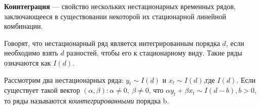 \documentclass[a0,final]{a0poster}
\begin{document}
\begin{multicols}{4}
\begin{tcolorbox}[colback=green!5!white,colframe=green!75!black]
\textbf{Коинтеграция} — свойство нескольких нестационарных временных рядов, заключающееся в существовании некоторой их стационарной линейной комбинации.
\end{tcolorbox}
Говорят, что нестационарный ряд является интегрированным порядка $d$, если необходимо взять $d$ разностей, чтобы его к стационарному виду. Такие ряды означаются как $I(d)$. \\
\begin{tcolorbox}[colback=blue!5!white,colframe=blue!75!black]
Рассмотрим два нестационарных ряда: $y_t\sim I(d)$ и $x_t\sim I(d)$,где $I(d)$. Если существует такой вектор $(\alpha,\beta):\alpha\neq0,\:\beta\neq0$, что $\alpha y_t+\beta x_t\sim I(d-b), b>0$, то ряды называются \textit{коинтегрированными} порядка b.
\end{tcolorbox}

\end{multicols}
\end{document}
